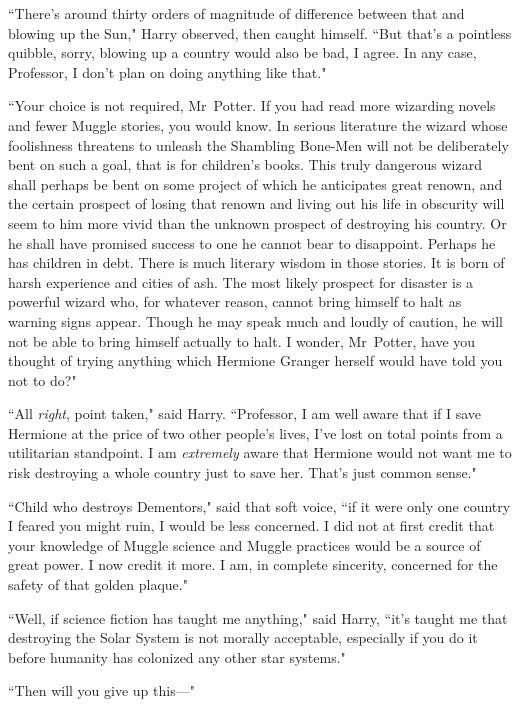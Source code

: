 ``There's around thirty orders of magnitude of difference between that and blowing up the Sun," Harry observed, then caught himself. ``But that's a pointless quibble, sorry, blowing up a country would also be bad, I agree. In any case, Professor, I don't plan on doing anything like that."

``Your choice is not required, Mr~Potter. If you had read more wizarding novels and fewer Muggle stories, you would know. In serious literature the wizard whose foolishness threatens to unleash the Shambling Bone-Men will not be deliberately bent on such a goal, that is for children's books. This truly dangerous wizard shall perhaps be bent on some project of which he anticipates great renown, and the certain prospect of losing that renown and living out his life in obscurity will seem to him more vivid than the unknown prospect of destroying his country. Or he shall have promised success to one he cannot bear to disappoint. Perhaps he has children in debt. There is much literary wisdom in those stories. It is born of harsh experience and cities of ash. The most likely prospect for disaster is a powerful wizard who, for whatever reason, cannot bring himself to halt as warning signs appear. Though he may speak much and loudly of caution, he will not be able to bring himself actually to halt. I wonder, Mr~Potter, have you thought of trying anything which Hermione Granger herself would have told you not to do?"

``All \emph{right}, point taken," said Harry. ``Professor, I am well aware that if I save Hermione at the price of two other people's lives, I've lost on total points from a utilitarian standpoint. I am \emph{extremely} aware that Hermione would not want me to risk destroying a whole country just to save her. That's just common sense."

``Child who destroys Dementors," said that soft voice, ``if it were only one country I feared you might ruin, I would be less concerned. I did not at first credit that your knowledge of Muggle science and Muggle practices would be a source of great power. I now credit it more. I am, in complete sincerity, concerned for the safety of that golden plaque."

``Well, if science fiction has taught me anything," said Harry, ``it's taught me that destroying the Solar System is not morally acceptable, especially if you do it before humanity has colonized any other star systems."

``Then will you give up this—"

